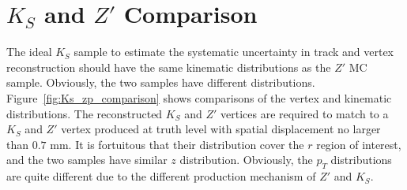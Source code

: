 \section{\texorpdfstring{$K_{S}$}{Ks} and \texorpdfstring{$Z'$}{Z'} Comparison}
\label{app:syst_Ks_Zp}

The ideal $K_{S}$ sample to estimate the systematic uncertainty in track and vertex reconstruction should have the same kinematic distributions as the $Z'$ MC sample. Obviously, the two samples have different distributions. Figure~\ref{fig:Ks_zp_comparison} shows comparisons of the vertex and kinematic distributions. The reconstructed $K_{S}$ and $Z'$ vertices are required to match to a $K_{S}$ and $Z'$ vertex produced at truth level with spatial displacement no larger than $0.7$ mm. It is fortuitous that their distribution cover the $r$ region of interest, and the two samples have similar $z$ distribution. Obviously, the $p_{T}$ distributions are quite different due to the different production mechanism of $Z'$ and $K_{S}$.


